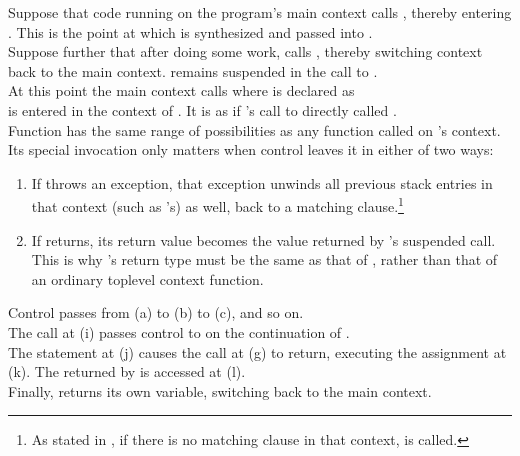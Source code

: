 Suppose that code running on the program's main context calls ,
thereby entering . This is the point at which  is synthesized
and passed into .\\
Suppose further that after doing some work,  calls ,
thereby switching context back to the main context.  remains suspended
in the call to .\\
At this point the main context calls 
where  is declared as\\
  is entered in the context of .
It is as if 's call to  directly called .\\
Function  has the same range of possibilities as any function called on
's context. Its special invocation only matters when control leaves it
in either of two ways:

\begin{enumerate}
  \item If  throws an exception, that exception unwinds all previous
        stack entries in that context (such as 's) as well, back to a
        matching  clause.\footnote{As stated in ,
        if there is no matching  clause in that context,
         is called.}
  \item If  returns, its return value becomes the value returned by
        's suspended  call. This is why 's
        return type must be the same as that of \resume, rather than that of an
        ordinary toplevel context function.
\end{enumerate}


Control passes from (a) to (b) to (c), and so on.\\
The  call at (i) passes control
to  on the continuation of .\\
The  statement at (j) causes the \resume call at (g) to return,
executing the assignment at (k). The  returned by  is
accessed at (l).\\
Finally,  returns its own  variable, switching back to the main
context.


